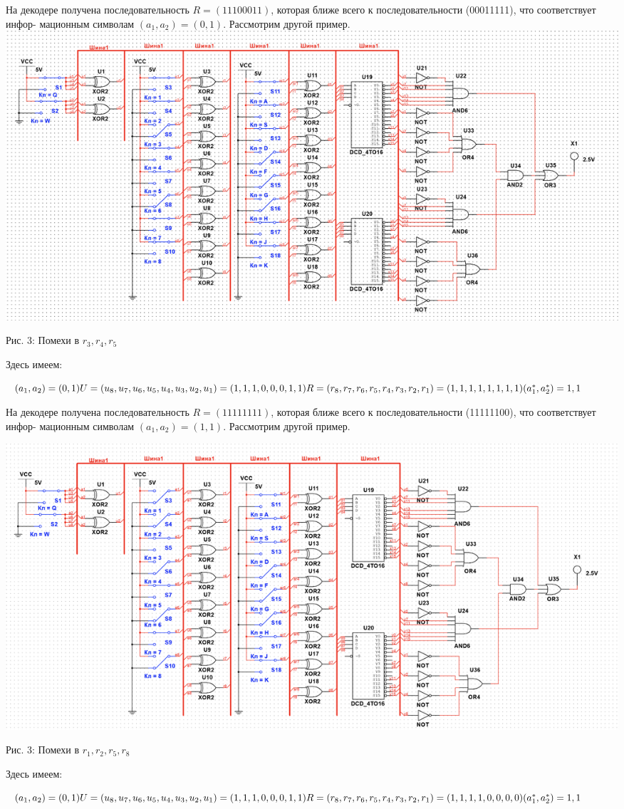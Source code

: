 \documentclass[14pt]{article}
\begin{document}
На декодере получена последовательность $R = (11100011)$, которая ближе всего к последовательности (00011111), что соответствует инфор- мационным символам $(a_{1}, a_{2}) = (0, 1)$. Рассмотрим другой пример.\\

\includegraphics[width=1\linewidth]{345.png}
\begin{center}
    Рис. 3: Помехи в $r_{3}, r_{4}, r_{5}$
\end{center}
Здесь имеем:
\begin{center}
    $(a_{1}, a_{2}) = (0, 1)\\
    U = (u_{8}, u_{7}, u_{6}, u_{5}, u_{4}, u_{3}, u_{2}, u_{1}) = (1, 1, 1, 0, 0, 0, 1, 1)\\
    R = (r_{8}, r_{7}, r_{6}, r_{5}, r_{4}, r_{3}, r_{2}, r_{1}) = (1, 1, 1, 1, 1, 1, 1, 1)\\
    (a_{1}^{*}, a_{2}^{*}) = {1, 1} 
    $
\end{center}

На декодере получена последовательность $R = (11111111)$, которая ближе всего к последовательности (11111100), что соответствует инфор- мационным символам $(a_{1}, a_{2}) = (1, 1)$. Рассмотрим другой пример.

\includegraphics[width=1\linewidth]{1258.png}
\begin{center}
    Рис. 3: Помехи в $r_{1}, r_{2}, r_{5}, r_{8}$
\end{center}
Здесь имеем:
\begin{center}
    $(a_{1}, a_{2}) = (0, 1)\\
    U = (u_{8}, u_{7}, u_{6}, u_{5}, u_{4}, u_{3}, u_{2}, u_{1}) = (1, 1, 1, 0, 0, 0, 1, 1)\\
    R = (r_{8}, r_{7}, r_{6}, r_{5}, r_{4}, r_{3}, r_{2}, r_{1}) = (1, 1, 1, 1, 0, 0, 0, 0)\\
    (a_{1}^{*}, a_{2}^{*}) = {1, 1} 
    $
\end{center}
\end{document}

